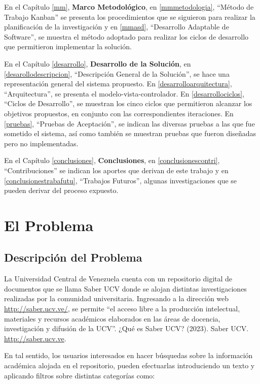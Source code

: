\documentclass[
  12pt,
  openany]{book}
\begin{document}
En el Capítulo \ref{mm}, \textbf{Marco Metodológico}, en \ref{mmmetodologia}, ``Método de Trabajo Kanban'' se presenta los procedimientos que se siguieron para realizar la planificación de la investigación y en \ref{mmasd}, ``Desarrollo Adaptable de Software'', se muestra el método adoptado para realizar los ciclos de desarrollo que permitieron implementar la solución.

En el Capítulo \ref{desarrollo}, \textbf{Desarrollo de la Solución}, en \ref{desarollodescripcion}, ``Descripción General de la Solución'', se hace una representación general del sistema propuesto. En \ref{desarrolloarquitectura}, ``Arquitectura'', se presenta el modelo-vista-controlador. En \ref{desarrollociclos}, ``Ciclos de Desarrollo'', se muestran los cinco ciclos que permitieron alcanzar los objetivos propuestos, en conjunto con las correspondientes iteraciones. En \ref{pruebas}, ``Pruebas de Aceptación'', se indican las diversas pruebas a las que fue sometido el sistema, así como también se muestran pruebas que fueron diseñadas pero no implementadas.

En el Capítulo \ref{conclusiones}, \textbf{Conclusiones}, en \ref{conclusionescontri}, ``Contribuciones'' se indican los aportes que derivan de este trabajo y en \ref{conclusionestrabafutu}, ``Trabajos Futuros'', algunas investigaciones que se pueden derivar del proceso expuesto.

\hypertarget{capproblema}{%
\chapter{El Problema}\label{capproblema}}

\hypertarget{desproblema}{%
\section{Descripción del Problema}\label{desproblema}}

La Universidad Central de Venezuela cuenta con un repositorio digital de documentos que se llama Saber UCV donde se alojan distintas investigaciones realizadas por la comunidad universitaria. Ingresando a la dirección web \url{http://saber.ucv.ve/}, se permite ``el acceso libre a la producción intelectual, materiales y recursos académicos elaborados en las áreas de docencia, investigación y difusión de la UCV''. ¿Qué es Saber UCV? (2023). Saber UCV. \href{http://saber.ucv.ve/}{http://saber.ucv.ve}.

En tal sentido, los usuarios interesados en hacer búsquedas sobre la información académica alojada en el repositorio, pueden efectuarlas introduciendo un texto y aplicando filtros sobre distintas categorías como:
\end{document}
